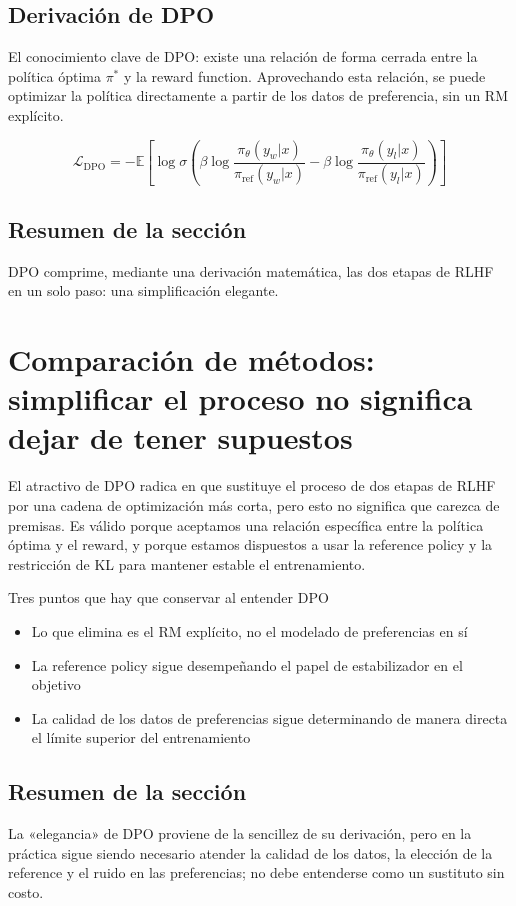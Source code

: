 \documentclass[a4paper]{article}
\begin{document}
\subsection{Derivación de DPO}
El conocimiento clave de DPO: existe una relación de forma cerrada entre la política óptima $\pi^*$ y la reward function. Aprovechando esta relación, se puede optimizar la política directamente a partir de los datos de preferencia, sin un RM explícito.

$$\mathcal{L}_{\text{DPO}} = -\mathbb{E}\left[\log \sigma\left(\beta \log \frac{\pi_\theta(y_w|x)}{\pi_{\text{ref}}(y_w|x)} - \beta \log \frac{\pi_\theta(y_l|x)}{\pi_{\text{ref}}(y_l|x)}\right)\right]$$

\subsection{Resumen de la sección}
DPO comprime, mediante una derivación matemática, las dos etapas de RLHF en un solo paso: una simplificación elegante.

\newpage
\section{Comparación de métodos: simplificar el proceso no significa dejar de tener supuestos}
El atractivo de DPO radica en que sustituye el proceso de dos etapas de RLHF por una cadena de optimización más corta, pero esto no significa que carezca de premisas. Es válido porque aceptamos una relación específica entre la política óptima y el reward, y porque estamos dispuestos a usar la reference policy y la restricción de KL para mantener estable el entrenamiento.

\begin{knowledgebox}{Tres puntos que hay que conservar al entender DPO}
\begin{itemize}
  \item Lo que elimina es el RM explícito, no el modelado de preferencias en sí
  \item La reference policy sigue desempeñando el papel de estabilizador en el objetivo
  \item La calidad de los datos de preferencias sigue determinando de manera directa el límite superior del entrenamiento
\end{itemize}
\end{knowledgebox}

\subsection{Resumen de la sección}
La «elegancia» de DPO proviene de la sencillez de su derivación, pero en la práctica sigue siendo necesario atender la calidad de los datos, la elección de la reference y el ruido en las preferencias; no debe entenderse como un sustituto sin costo.
\end{document}
